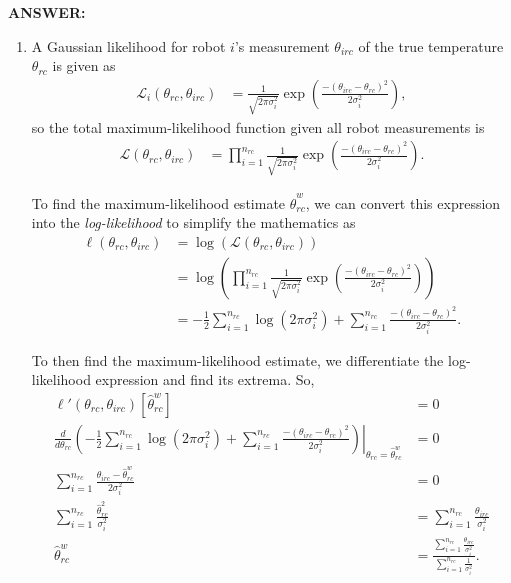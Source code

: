 \documentclass[12pt]{article}
\begin{document}
\noindent\textbf{ANSWER:}
\begin{enumerate}[label=(\alph*)]
    \item A Gaussian likelihood for robot $i$'s measurement $\theta_{irc}$ of the true temperature $\theta_{rc}$ is given as
    \begin{align*}
        \mathscr L_i(\theta_{rc},\theta_{irc})&=\frac{1}{\sqrt{2\pi\sigma_i^2}}\exp\left(\frac{-(\theta_{irc}-\theta_{rc})^2}{2\sigma_i^2}\right),
    \end{align*}
    so the total maximum-likelihood function given all robot measurements is
    \begin{align*}
        \mathscr L(\theta_{rc},\theta_{irc})&=\prod_{i=1}^{n_{rc}}\frac{1}{\sqrt{2\pi\sigma_i^2}}\exp\left(\frac{-(\theta_{irc}-\theta_{rc})^2}{2\sigma_i^2}\right).
    \end{align*}

    To find the maximum-likelihood estimate $\hat\theta_{rc}^w$, we can convert this expression into the \textit{log-likelihood} to simplify the mathematics as
    \begin{align*}
        \ell(\theta_{rc},\theta_{irc})&=\log(\mathscr L(\theta_{rc},\theta_{irc}))\\
        &=\log\left(\prod_{i=1}^{n_{rc}}\frac{1}{\sqrt{2\pi\sigma_i^2}}\exp\left(\frac{-(\theta_{irc}-\theta_{rc})^2}{2\sigma_i^2}\right)\right)\\
        &=-\frac12\sum_{i=1}^{n_{rc}}\log(2\pi\sigma_i^2)+\sum_{i=1}^{n_{rc}}\frac{-(\theta_{irc}-\theta_{rc})^2}{2\sigma_i^2}.
    \end{align*}

    To then find the maximum-likelihood estimate, we differentiate the log-likelihood expression and find its extrema. So,
    \begin{align}
        \ell'(\theta_{rc},\theta_{irc})[\hat\theta_{rc}^w]&=0\nonumber\\
        \frac{d}{d\theta_{rc}}\left.\left(-\frac12\sum_{i=1}^{n_{rc}}\log(2\pi\sigma_i^2)+\sum_{i=1}^{n_{rc}}\frac{-(\theta_{irc}-\theta_{rc})^2}{2\sigma_i^2}\right)\right|_{\theta_{rc}=\hat\theta_{rc}^w}&=0\nonumber\\
        \sum_{i=1}^{n_{rc}}\frac{\theta_{irc}-\hat\theta_{rc}^w}{2\sigma_i^2}&=0\nonumber\\
        \sum_{i=1}^{n_{rc}}\frac{\hat\theta_{rc}^2}{\sigma_i^2}&=\sum_{i=1}^{n_{rc}}\frac{\theta_{irc}}{\sigma_i^2}\nonumber\\
        \hat\theta_{rc}^w&=\frac{\sum_{i=1}^{n_{rc}}\frac{\theta_{irc}}{\sigma_i^2}}{\sum_{i=1}^{n_{rc}}\frac{1}{\sigma_i^2}}.\label{eqn:theta_w}
    \end{align}


\end{enumerate}
\end{document}
